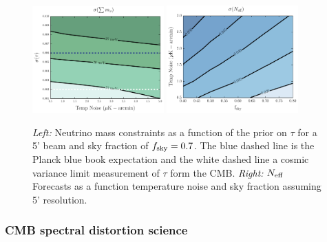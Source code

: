 \begin{figure}[t!]
\begin{center}
\includegraphics[width=0.45\textwidth]{figs/Mnu_tauprior.pdf}
\includegraphics[width=0.45\textwidth]{figs/Neff.pdf}
\caption{ {\it Left:} Neutrino mass constraints as a function of the prior on $\tau$ for a 5' beam and sky fraction of $f_{\rm sky} = 0.7$.  The blue dashed line is the Planck blue book expectation and the white dashed line a cosmic variance limit measurement of $\tau$ form the CMB. {\it Right:} ${N_{\rm eff}}$ Forecasts as a function temperature noise and sky fraction assuming 5' resolution.}
\label{fig:Neff_future}
\end{center}
\end{figure}


\vspace{-0.15in}
\subsubsection{CMB spectral distortion science}
\vspace{-0.05in}

